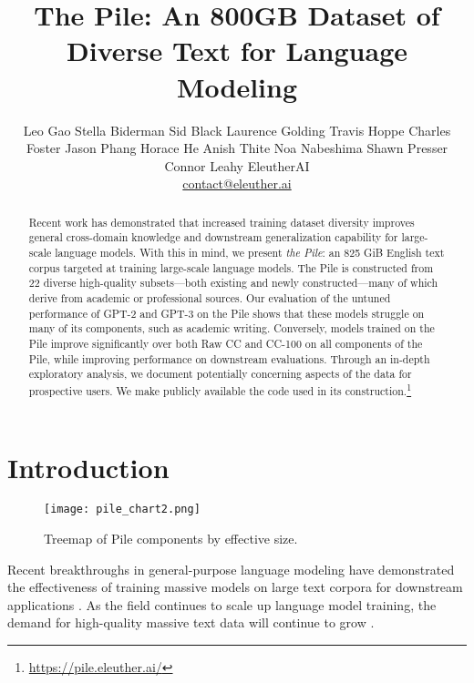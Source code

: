 \documentclass[11pt,a4paper]{article}
\title{The Pile: An 800GB Dataset of Diverse Text for Language Modeling}
\author{
    Leo Gao \And Stella Biderman \And Sid Black \And Laurence Golding
    \AND Travis Hoppe \And Charles Foster \And Jason Phang \And Horace He
    \AND Anish Thite \And Noa Nabeshima \And Shawn Presser \And Connor Leahy
    \AND \textnormal{EleutherAI}\\\url{contact@eleuther.ai}
}
\begin{document}
\maketitle

\begin{abstract}
    Recent work has demonstrated that increased training dataset diversity improves general cross-domain knowledge and downstream generalization capability for large-scale language models. With this in mind, we present \textit{the Pile}: an 825 GiB English text corpus targeted at training large-scale language models. The Pile is constructed from 22 diverse high-quality subsets---both existing and newly constructed---many of which derive from academic or professional sources. Our evaluation of the untuned performance of GPT-2 and GPT-3 on the Pile shows that these models struggle on many of its components, such as academic writing. Conversely, models trained on the Pile improve significantly over both Raw CC and CC-100 on all components of the Pile, while improving performance on downstream evaluations. Through an in-depth exploratory analysis, we document potentially concerning aspects of the data for prospective users. We make publicly available the code used in its construction.\footnote{\url{https://pile.eleuther.ai/}}

\end{abstract}

\section{Introduction}

\begin{figure*}
  \texttt{[image: pile\_chart2.png]}
  \caption{Treemap of Pile components by effective size.}
  \label{fig:proportions}
\end{figure*}

Recent breakthroughs in general-purpose language modeling have demonstrated the effectiveness of training massive models on large text corpora for downstream applications \citep{GPT2,Megatron,T5,TuringNLG,GPT3,GShard}. 
As the field continues to scale up language model training, the demand for high-quality massive text data will continue to grow \citep{scaling-nlms}.
\end{document}
